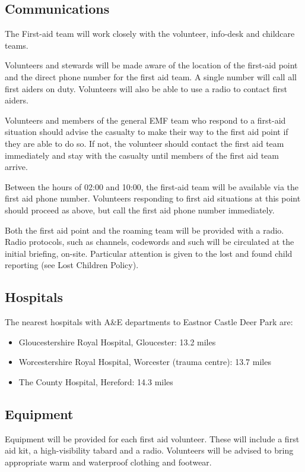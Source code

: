 \subsection{Communications}

The First-aid team will work closely with the volunteer, info-desk and childcare
teams.

Volunteers and stewards will be made aware of the location of the first-aid
point and the direct phone number for the first aid team. A single number will 
call all first aiders on duty. Volunteers will also be able to use a radio to 
contact first aiders.

Volunteers and members of the general EMF team who respond to a first-aid
situation should advise the casualty to make their way to the first aid point
if they are able to do so. If not, the volunteer should contact the first aid
team immediately and stay with the casualty until members of the first aid team
arrive.

Between the hours of 02:00 and 10:00, the first-aid team will be available via the
first aid phone number. Volunteers responding to first aid situations at this
point should proceed as above, but call the first aid phone number
immediately.

Both the first aid point and the roaming team will be provided with a radio.
Radio protocols, such as channels, codewords and such will be circulated at the
initial briefing, on-site. Particular attention is given to the lost and found
child reporting (see Lost Children Policy).

\subsection{Hospitals}

The nearest hospitals with A\&E departments to Eastnor Castle Deer Park are:

\begin{itemize}
    \tightlist
\item Gloucestershire Royal Hospital, Gloucester: 13.2 miles
\item Worcestershire Royal Hospital, Worcester (trauma centre): 13.7 miles
\item The County Hospital, Hereford: 14.3 miles
\end{itemize}

\subsection{Equipment}
Equipment will be provided for each first aid volunteer. These will include a
first aid kit, a high-visibility tabard and a radio. Volunteers will be advised
to bring appropriate warm and waterproof clothing and footwear.

